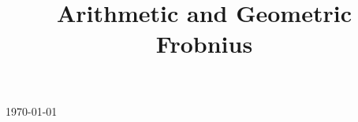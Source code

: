 

\title{Arithmetic and Geometric Frobnius}

\usepackage[sort=standard]{glossaries} 
\makeglossaries
\setcounter{tocdepth}{3}



\maketitle
\centerline{\today}
\tableofcontents








